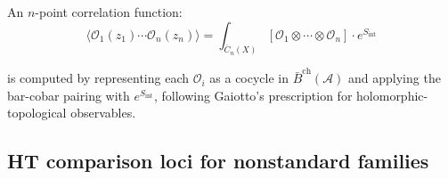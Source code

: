 \begin{example}
An $n$-point correlation function:
\[\langle \mathcal{O}_1(z_1) \cdots \mathcal{O}_n(z_n) \rangle =
\int_{\overline{C}_n(X)} [\mathcal{O}_1 \otimes \cdots \otimes \mathcal{O}_n]
\cdot e^{S_{\text{int}}}\]

is computed by representing each $\mathcal{O}_i$ as a cocycle in $\bar{B}^{\text{ch}}(\mathcal{A})$ and applying the bar-cobar pairing with $e^{S_{\text{int}}}$, following Gaiotto's prescription for holomorphic-topological observables.
\end{example}

\subsection{HT comparison loci for nonstandard families}

